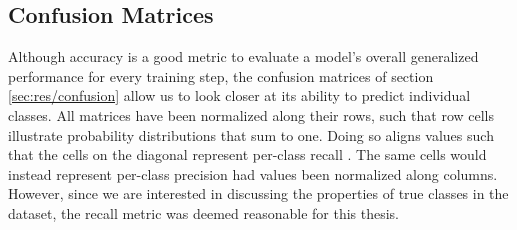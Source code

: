 

\subsection{Confusion Matrices} \label{sec:disc/classification/cm}



Although accuracy is a good metric to evaluate a model's overall generalized performance for every training step, the confusion matrices of section \ref{sec:res/confusion} allow us to look closer at its ability to predict individual classes. All matrices have been normalized along their rows, such that row cells illustrate probability distributions that sum to one. Doing so aligns values such that the cells on the diagonal represent per-class recall
. The same cells would instead represent per-class precision had values been normalized along columns. However, since we are interested in discussing the properties of true classes in the dataset, the recall metric was deemed reasonable for this thesis.

